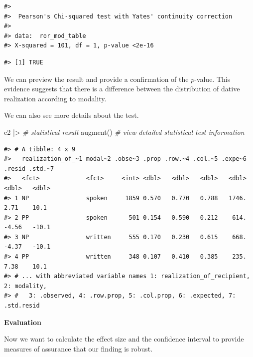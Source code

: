 \documentclass[
  letterpaper,
]{latex/krantz}
\newenvironment{Shaded}{\begin{snugshade}}{\end{snugshade}}
\newcommand{\CommentTok}[1]{\textcolor[rgb]{0.00,0.00,0.00}{\textit{#1}}}
\newcommand{\DecValTok}[1]{\textcolor[rgb]{0.00,0.00,0.00}{#1}}
\newcommand{\FunctionTok}[1]{\textcolor[rgb]{0.00,0.00,0.00}{#1}}
\newcommand{\NormalTok}[1]{\textcolor[rgb]{0.00,0.00,0.00}{#1}}
\newcommand{\SpecialCharTok}[1]{\textcolor[rgb]{0.00,0.00,0.00}{#1}}
\begin{document}
\begin{verbatim}
#> 
#>  Pearson's Chi-squared test with Yates' continuity correction
#> 
#> data:  ror_mod_table
#> X-squared = 101, df = 1, p-value <2e-16
\end{verbatim}

\begin{Shaded}
\end{Shaded}

\begin{verbatim}
#> [1] TRUE
\end{verbatim}

We can preview the result and provide a confirmation of the \(p\)-value.
This evidence suggests that there is a difference between the
distribution of dative realization according to modality.

We can also see more details about the test.

\begin{Shaded}
\begin{Highlighting}[]
\NormalTok{c2 }\SpecialCharTok{|\textgreater{}} \CommentTok{\# statistical result}
  \FunctionTok{augment}\NormalTok{() }\CommentTok{\# view detailed statistical test information}
\end{Highlighting}
\end{Shaded}

\begin{verbatim}
#> # A tibble: 4 x 9
#>   realization_of_~1 modal~2 .obse~3 .prop .row.~4 .col.~5 .expe~6 .resid .std.~7
#>   <fct>             <fct>     <int> <dbl>   <dbl>   <dbl>   <dbl>  <dbl>   <dbl>
#> 1 NP                spoken     1859 0.570   0.770   0.788   1746.   2.71    10.1
#> 2 PP                spoken      501 0.154   0.590   0.212    614.  -4.56   -10.1
#> 3 NP                written     555 0.170   0.230   0.615    668.  -4.37   -10.1
#> 4 PP                written     348 0.107   0.410   0.385    235.   7.38    10.1
#> # ... with abbreviated variable names 1: realization_of_recipient, 2: modality,
#> #   3: .observed, 4: .row.prop, 5: .col.prop, 6: .expected, 7: .std.resid
\end{verbatim}

\textbf{Evaluation}

Now we want to calculate the effect size and the confidence interval to
provide measures of assurance that our finding is robust.
\end{document}
